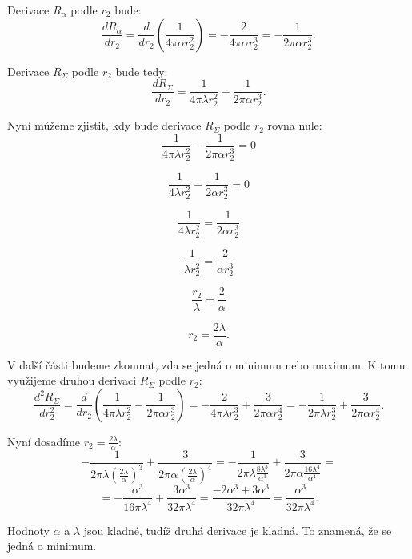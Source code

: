\documentclass{article}
\begin{document}
Derivace $R_\alpha$ podle $r_2$ bude:
$$
    \frac{dR_\alpha}{dr_2} = \frac{d}{dr_2} \left( \frac{1}{4 \pi \alpha r_2^2} \right) = -\frac{2}{4 \pi \alpha r_2^3} = -\frac{1}{2 \pi \alpha r_2^3}.
$$

Derivace $R_\Sigma$ podle $r_2$ bude tedy:
$$
    \frac{dR_\Sigma}{dr_2} = \frac{1}{4 \pi \lambda r_2^2} - \frac{1}{2 \pi \alpha r_2^3}.
$$

Nyní můžeme zjistit, kdy bude derivace $R_\Sigma$ podle $r_2$ rovna nule:
$$
    \frac{1}{4 \pi \lambda r_2^2} - \frac{1}{2 \pi \alpha r_2^3} = 0
$$

$$
    \frac{1}{4 \lambda r_2^2} - \frac{1}{2 \alpha r_2^3} = 0
$$

$$
    \frac{1}{4 \lambda r_2^2} = \frac{1}{2 \alpha r_2^3}
$$

$$
    \frac{1}{\lambda r_2^2} = \frac{2}{\alpha r_2^3}
$$

$$
    \frac{r_2}{\lambda} = \frac{2}{\alpha}
$$

$$
    r_2 = \frac{2 \lambda}{\alpha}.
$$

V další části budeme zkoumat, zda se jedná o minimum nebo maximum. K tomu využijeme druhou derivaci $R_\Sigma$ podle $r_2$:
$$
    \frac{d^2R_\Sigma}{dr_2^2} = \frac{d}{dr_2} \left( \frac{1}{4 \pi \lambda r_2^2} - \frac{1}{2 \pi \alpha r_2^3} \right) = -\frac{2}{4 \pi \lambda r_2^3} + \frac{3}{2 \pi \alpha r_2^4} = - \frac{1}{2 \pi \lambda r_2^3} + \frac{3}{2 \pi \alpha r_2^4}.
$$

Nyní dosadíme $r_2 = \frac{2 \lambda}{\alpha}$:
$$
    -\frac{1}{2 \pi \lambda \left( \frac{2 \lambda}{\alpha} \right)^3} + \frac{3}{2 \pi \alpha \left( \frac{2 \lambda}{\alpha} \right)^4} = -\frac{1}{2 \pi \lambda \frac{8 \lambda^3}{\alpha^3}} + \frac{3}{2 \pi \alpha \frac{16 \lambda^4}{\alpha^4}} =
$$
$$
    = -\frac{\alpha^3}{16 \pi \lambda^4} + \frac{3 \alpha^3}{32 \pi \lambda^4} = \frac{-2 \alpha^3 + 3 \alpha^3}{32 \pi \lambda^4} = \frac{\alpha^3}{32 \pi \lambda^4}.
$$

Hodnoty $\alpha$ a $\lambda$ jsou kladné, tudíž druhá derivace je kladná. To znamená, že se jedná o minimum.

\begin{center}
\end{center}
\end{document}

